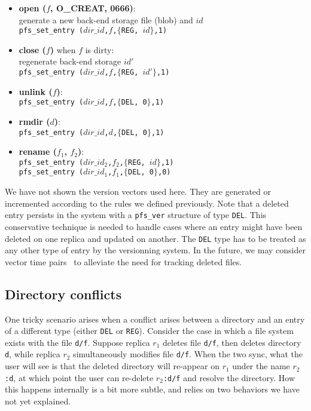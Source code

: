 \begin{itemize}
  \item \textbf{open ($f$, O\_CREAT, 0666)}: \\
    generate a new back-end storage file (blob) and $id$ \\
    {\tt pfs\_set\_entry ($dir\_id$,$f$,$\{$REG, $id$$\}$,1)}

  \item \textbf{close ($f$)} when $f$ is dirty: \\
    regenerate back-end storage $id'$ \\
    {\tt pfs\_set\_entry ($dir\_id$,$f$,$\{$REG, $id'$$\}$,1)}
    
  \item \textbf{unlink ($f$)}: \\
    {\tt pfs\_set\_entry ($dir\_id$,$f$,$\{$DEL, 0$\}$,1)}

  \item \textbf{rmdir ($d$)}: \\
    {\tt pfs\_set\_entry ($dir\_id$,$d$,$\{$DEL, 0$\}$,1)}

  \item \textbf{rename ($f_1$, $f_2$)}: \\
    {\tt pfs\_set\_entry ($dir\_id_2$,$f_2$,$\{$REG, $id$$\}$,1)} \\
    {\tt pfs\_set\_entry ($dir\_id_1$,$f_1$,$\{$DEL, 0$\}$,0)}
\end{itemize}

We have not shown the version vectors used here. They are generated or
incremented according to the rules we defined previously. Note that a
deleted entry persists in the system with a \texttt{pfs\_ver}
structure of type {\tt DEL}\@.  This conservative technique is needed
to handle cases where an entry might have been deleted on one replica
and updated on another. The {\tt DEL} type has to be treated as any
other type of entry by the versionning system.  In the future, we may
consider vector time pairs~\cite{cox:tra} to alleviate the need for
tracking deleted files.

\subsection{Directory conflicts}
\label{sec:dirconflict}

One tricky scenario arises when a conflict arises between a directory
and an entry of a different type (either \texttt{DEL} or
\texttt{REG}).  Consider the case in which a file system exists with
the file \texttt{d/f}.  Suppose replica $r_1$ deletes file
\texttt{d/f}, then deletes directory \texttt{d}, while replica $r_2$
simultaneously modifies file \texttt{d/f}.  When the two sync, what
the user will see is that the deleted directory will re-appear on
$r_1$ under the name \texttt{$r_2$:d}, at which point the user can
re-delete \texttt{$r_2$:d/f} and resolve the directory.  How this
happens internally is a bit more subtle, and relies on two behaviors
we have not yet explained.

